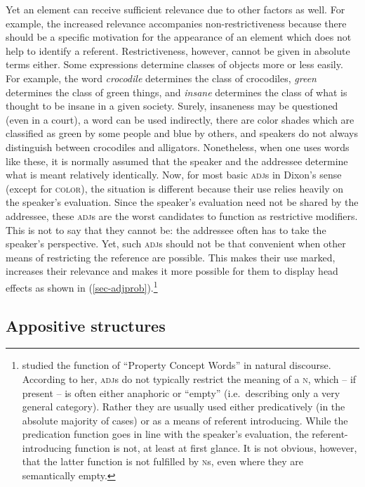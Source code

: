 \documentclass[output=paper
  ,nobabel
  ,draftmode
  ,colorlinks, citecolor=brown
]{langscibook}
\begin{document}
Yet an element can receive sufficient relevance due to other factors as well. For example, the increased relevance accompanies non-restrictiveness because there should be a specific motivation for the appearance of an element which does not help to identify a referent. Restrictiveness, however, cannot be given in absolute terms either. Some expressions determine classes of objects more or less easily. For example, the word \emph{crocodile} determines the class of crocodiles, \emph{green} determines the class of green things, and \emph{insane} determines the class of what is thought to be insane in a given society. Surely, insaneness may be questioned (even in a court), a word can be used indirectly, there are color shades which are classified as green by some people and blue by others, and speakers do not always distinguish between crocodiles and alligators. Nonetheless, when one uses words like these, it is normally assumed that the speaker and the addressee determine what is meant relatively identically. Now, for most basic \textsc{adj}s in Dixon's sense (except for \textsc{color}), the situation is different because their use relies heavily on the speaker's evaluation. Since the speaker's evaluation need not be shared by the addressee, these \textsc{adj}s are the worst candidates to function as restrictive modifiers. This is not to say that they cannot be: the addressee often has to take the speaker's perspective. Yet, such \textsc{adj}s should not be that convenient when other means of restricting the reference are possible. This makes their use marked, increases their relevance and makes it more possible for them to display head effects as shown in (\ref{sec-adjprob}).\footnote{\citet{Thompson1989} studied the function of ``Property Concept Words'' in natural discourse. According to her, \textsc{adj}s do not typically restrict the meaning of a \textsc{n}, which – if present – is often either anaphoric or ``empty'' (i.e.\ describing only a very general category). Rather they are usually used either predicatively (in the absolute majority of cases) or as a means of referent introducing. While the predication function goes in line with the speaker’s evaluation, the referent-introducing function is not, at least at first glance. It is not obvious, however, that the latter function is not fulfilled by \textsc{n}s, even where they are semantically empty.}


\subsection{Appositive structures}\label{sec-appositive}
\end{document}
